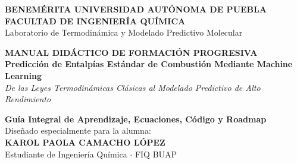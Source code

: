 \documentclass[11pt,letterpaper]{report}
\begin{document}
\begin{titlepage}
    \begin{center}
        \vspace*{0.3cm}
        {\LARGE \textbf{BENEMÉRITA UNIVERSIDAD AUTÓNOMA DE PUEBLA}}\\[0.3cm]
        {\Large \textbf{FACULTAD DE INGENIERÍA QUÍMICA}}\\[0.2cm]
        {\large Laboratorio de Termodinámica y Modelado Predictivo Molecular}\\[1.2cm]

        \begin{tcolorbox}[colback=buapblue!5,colframe=buapblue,arc=2mm,boxrule=1.5pt]
            \centering\vspace{0.3cm}
            {\huge \bfseries \color{buapblue} MANUAL DIDÁCTICO DE FORMACIÓN PROGRESIVA}\\[0.4cm]
            {\Large \bfseries Predicción de Entalpías Estándar de Combustión Mediante Machine Learning}\\[0.3cm]
            {\small \textit{De las Leyes Termodinámicas Clásicas al Modelado Predictivo de Alto Rendimiento}}\vspace{0.3cm}
        \end{tcolorbox}

        \vspace{1.2cm}

        {\large \textbf{Guía Integral de Aprendizaje, Ecuaciones, Código y Roadmap}}\\[0.3cm]
        {\normalsize Diseñado especialmente para la alumna:}\\[0.2cm]
        {\Large \bfseries \color{buapblue} KAROL PAOLA CAMACHO LÓPEZ}\\[0.2cm]
        {\normalsize Estudiante de Ingeniería Química $\cdot$ FIQ BUAP}\\[1.0cm]

        \vfill


\end{center}
\end{titlepage}
\end{document}
